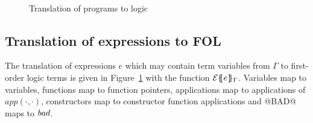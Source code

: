 \begin{figure}
\[\begin{array}{c}
\end{array}\]
\caption{Translation of programs to logic}\label{fig:etrans}
\end{figure}

\subsection{Translation of expressions to FOL}

The translation of expressions $e$ which may contain term variables from $\Gamma$ to 
first-order logic terms is given in Figure~\ref{fig:etrans} with the function
${\cal E}\{\!\!\{e\}\!\!\}_{\Gamma}$. Variables map to variables, functions map to function pointers, 
applications map to applications of $app(\cdot,\cdot)$, constructors map to constructor
function applications and @BAD@ maps to $\mathop{bad}$.

